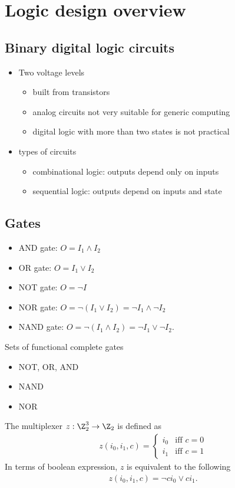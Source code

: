 \documentclass{article}
\begin{document}
\section{Logic design overview}
\subsection{Binary digital logic circuits}
\begin{itemize}
	\item Two voltage levels \begin{itemize}
		\item built from transistors
		\item analog circuits not very suitable for generic computing
		\item digital logic with more than two states is not practical 
	\end{itemize}
    \item types of circuits \begin{itemize}
		\item combinational logic: outputs depend only on inputs
		\item sequential logic: outputs depend on inputs and state
	\end{itemize}
\end{itemize}
\subsection{Gates}
\begin{itemize}
	\item AND gate: $O = I_1 \wedge I_2$
	\item OR gate: $O = I_1 \vee I_2$
	\item NOT gate: $O = \neg I$
	\item NOR gate: $O = \neg(I_1 \vee I_2) = \neg I_1 \wedge \neg I_2$
	\item NAND gate: $O = \neg(I_1 \wedge I_2) = \neg I_1 \vee \neg I_2$.
\end{itemize}
Sets of functional complete gates
\begin{itemize}
	\item NOT, OR, AND
	\item NAND
	\item NOR
\end{itemize}
\begin{definition}
	The multiplexer $z:\Z_2^3\to\Z_2$ is defined as
	\begin{align*}
		z(i_0,i_1,c) = \begin{cases}
			i_0 &\text{iff }c=0\\
			i_1 &\text{iff }c=1
		\end{cases}
	\end{align*}
	In terms of boolean expression, $z$ is equivalent to the following 
	\begin{align*}
		z(i_0,i_1,c) = \neg c i_0 \vee ci_1.
	\end{align*}
\end{definition}
\end{document}
